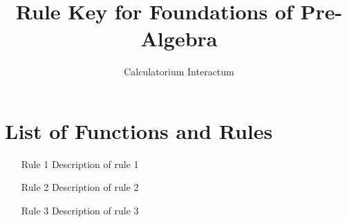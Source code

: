 \documentclass{article}
\title{Rule Key for Foundations of Pre-Algebra}
\author{Calculatorium Interactum}
\begin{document}
\maketitle

\section{List of Functions and Rules}

\begin{enumerate}
    \item [Rule 1] Description of rule 1
    \item [Rule 2] Description of rule 2
    \item [Rule 3] Description of rule 3
\end{enumerate}
\end{document}
